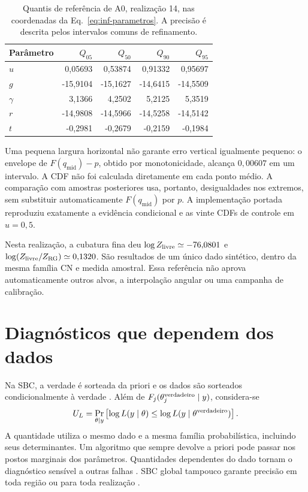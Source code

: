 \begin{table}[htbp]
 \centering\small\singlespacing
 \caption{Quantis de referência de A0, realização 14, nas coordenadas
 da Eq.~\eqref{eq:inf-parametros}. A precisão é descrita pelos
 intervalos comuns de refinamento.}
 \label{tab:inf-quantis-ref}
 \begin{tabular}{@{}lrrrr@{}}
 \toprule
 Parâmetro & \(Q_{05}\) & \(Q_{50}\) & \(Q_{90}\) & \(Q_{95}\)\\
 \midrule
 \(u\)      & 0,05693 & 0,53874 & 0,91332 & 0,95697\\
 \(g\)      & -15,9104 & -15,1627 & -14,6415 & -14,5509\\
 \(\gamma\) & 3,1366 & 4,2502 & 5,2125 & 5,3519\\
 \(r\)      & -14,9808 & -14,5966 & -14,5258 & -14,5142\\
 \(t\)      & -0,2981 & -0,2679 & -0,2159 & -0,1984\\
 \bottomrule
 \end{tabular}
\end{table}

Uma pequena largura horizontal não garante erro vertical igualmente
pequeno: o envelope de \(F(q_{\mathrm{mid}})-p\), obtido por
monotonicidade, alcança \(0{,}00607\) em um intervalo. A CDF não
foi calculada diretamente em cada ponto médio. A comparação com
amostras posteriores usa, portanto, desigualdades nos extremos,
sem substituir automaticamente \(F(q_{\mathrm{mid}})\) por \(p\).
A implementação portada reproduziu exatamente a evidência condicional
e as vinte CDFs de controle em \(u=0{,}5\).

Nesta realização, a cubatura fina deu
\(\log Z_{\rm livre}\simeq-76{,}0801\) e
\(\log(Z_{\rm livre}/Z_{\rm RG})\simeq0{,}1320\).
São resultados de um único dado sintético, dentro da mesma família CN
e medida amostral. Essa referência não aprova automaticamente outros
alvos, a interpolação angular ou uma campanha de calibração.

\section{Diagnósticos que dependem dos dados}

Na SBC, a verdade é sorteada da priori e os dados são sorteados
condicionalmente à verdade \cite{talts2018}. Além de
\(F_j(\theta_j^{\rm verdadeiro}\mid y)\), considera-se
\begin{equation}
 U_L=\Pr_{\theta\mid y}
  \left[\log L(y\mid\theta)\leq
        \log L(y\mid\theta^{\rm verdadeiro})\right].
 \label{eq:inf-pit-logl}
\end{equation}
A quantidade utiliza o mesmo dado e a mesma família probabilística,
incluindo seus determinantes. Um algoritmo que sempre devolve a priori
pode passar nos postos marginais dos parâmetros. Quantidades dependentes
do dado tornam o diagnóstico sensível a outras falhas
\cite{modrak2025}. SBC global tampouco garante precisão em toda região
ou para toda realização \cite{sailynoja2026}.

